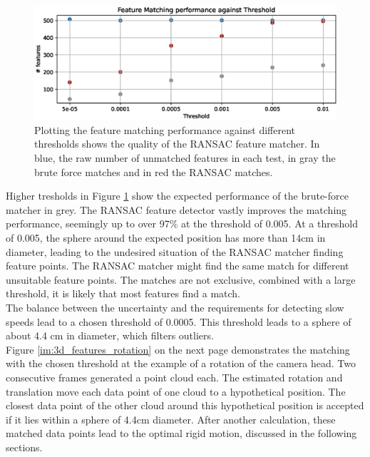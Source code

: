 \begin{figure}[H]
    \centering
    \includegraphics[width=1.0\textwidth]{images/noise_against_threshold.eps}
    \caption{Plotting the feature matching performance against different thresholds shows the quality of the RANSAC feature matcher. In blue, the raw number of unmatched features in each test, in gray the brute force matches and in red the RANSAC matches.}
    \label{im:noise_against_thresh}
\end{figure}
Higher tresholds in Figure \ref{im:noise_against_thresh} show the expected performance of the brute-force matcher in grey. The RANSAC feature detector vastly improves the matching performance, seemingly up to over 97\% at the threshold of 0.005. At a threshold of 0.005, the sphere around the expected position has more than 14cm in diameter, leading to the undesired situation of the RANSAC matcher finding feature points. The RANSAC matcher might find the same match for different unsuitable feature points. The matches are not exclusive, combined with a large threshold, it is likely that most features find a match.\\
The balance between the uncertainty and the requirements for detecting slow speeds lead to a chosen threshold of 0.0005. This threshold leads to a sphere of about 4.4 cm in diameter, which filters outliers.\\ 
Figure \ref{im:3d_features_rotation} on the next page demonstrates the matching with the chosen threshold at the example of a rotation of the camera head. Two consecutive frames generated a point cloud each. The estimated rotation and translation move each data point of one cloud to a hypothetical position. The closest data point of the other cloud around this hypothetical position is accepted if it lies within a sphere of 4.4cm diameter. 
After another calculation, these matched data points lead to the optimal rigid motion, discussed in the following sections.\\
